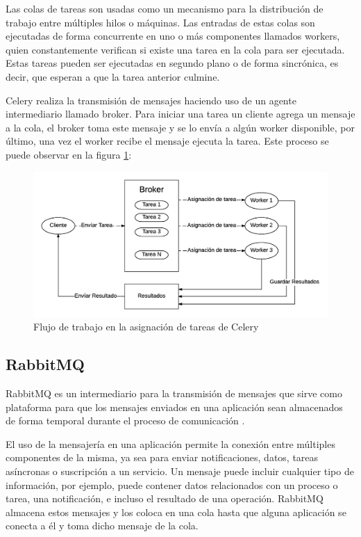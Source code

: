 Las colas de tareas son usadas como un mecanismo para la distribución de trabajo entre múltiples hilos o máquinas.
Las entradas de estas colas son ejecutadas de forma concurrente en uno o más componentes llamados workers, quien constantemente verifican si existe una tarea en la cola para ser ejecutada.
Estas tareas pueden ser ejecutadas en segundo plano o de forma sincrónica, es decir, que esperan a que la tarea anterior culmine.

Celery realiza la transmisión de mensajes haciendo uso de un agente intermediario llamado broker.
Para iniciar una tarea un cliente agrega un mensaje a la cola, el broker toma este mensaje y se lo envía a algún worker disponible, por último, una vez el worker recibe el mensaje ejecuta la tarea.
Este proceso se puede observar en la figura \ref{fig:celery}:

\begin{figure}[H]
	\centering
		\includegraphics[width=.9\textwidth]{figures/celery}
	\caption{Flujo de trabajo en la asignación de tareas de Celery}
	\label{fig:celery}
\end{figure}

\subsection{RabbitMQ}

RabbitMQ es un intermediario para la transmisión de mensajes que sirve como plataforma para que los mensajes enviados
en una aplicación sean almacenados de forma temporal durante el proceso de comunicación \cite{14}.

El uso de la mensajería en una aplicación permite la conexión entre múltiples componentes de la misma, ya sea para enviar notificaciones, datos, tareas asíncronas o suscripción a un servicio.
Un mensaje puede incluir cualquier tipo de información, por ejemplo, puede contener datos relacionados con un proceso o tarea, una notificación, e incluso el resultado de una operación.
RabbitMQ almacena estos mensajes y los coloca en una cola hasta que alguna aplicación se conecta a él y toma dicho mensaje de la cola.

